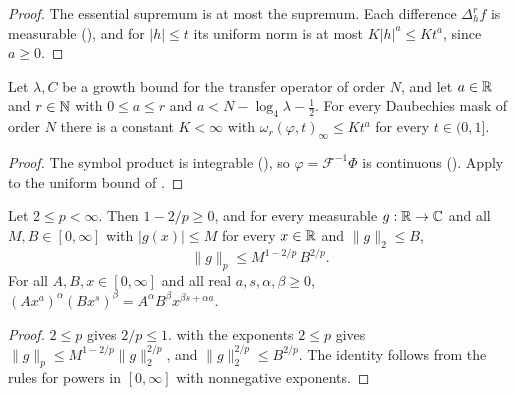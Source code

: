 \begin{proof}
\leanok
{}
The essential supremum is at most the supremum. Each difference $\Delta_h^r f$ is measurable
(), and for $|h| \leq t$ its uniform norm is at most
$K |h|^a \leq K t^a$, since $a \geq 0$.
\end{proof}

\begin{proposition}
\label{prop:daub-modulus-top}
\leanok
{}
Let $\lambda, C$ be a growth bound for the transfer operator of order $N$, and let $a \in \mathbb{R}$ and
$r \in \mathbb{N}$ with $0 \leq a \leq r$ and $a < N - \log_4 \lambda - \frac12$. For every Daubechies
mask of order $N$ there is a constant $K < \infty$ with $\omega_r(\varphi, t)_\infty \leq K t^a$
for every $t \in (0, 1]$.
\end{proposition}

\begin{proof}
\leanok
{}
The symbol product is integrable (), so
$\varphi = \mathcal F^{-1} \Phi$ is continuous (). Apply
 to the uniform bound of
.
\end{proof}

\begin{lemma}
\label{lem:daub-interpolation-two-infty}
\leanok
Let $2 \leq p < \infty$. Then $1 - 2/p \geq 0$, and for every measurable $g : \mathbb{R} \to \mathbb{C}$ and all
$M, B \in [0, \infty]$ with $|g(x)| \leq M$ for every $x \in \mathbb{R}$ and $\|g\|_2 \leq B$,
\[
  \|g\|_p \leq M^{1 - 2/p} \, B^{2/p} .
\]
For all $A, B, x \in [0, \infty]$ and all real $a, s, \alpha, \beta \geq 0$,
$(A x^a)^\alpha (B x^s)^\beta = A^\alpha B^\beta x^{\beta s + \alpha a}$.
\end{lemma}

\begin{proof}
\leanok
{}
$2 \leq p$ gives $2/p \leq 1$.  with the exponents $2 \leq p$ gives
$\|g\|_p \leq M^{1 - 2/p} \|g\|_2^{2/p}$, and $\|g\|_2^{2/p} \leq B^{2/p}$. The identity follows
from the rules for powers in $[0, \infty]$ with nonnegative exponents.
\end{proof}

